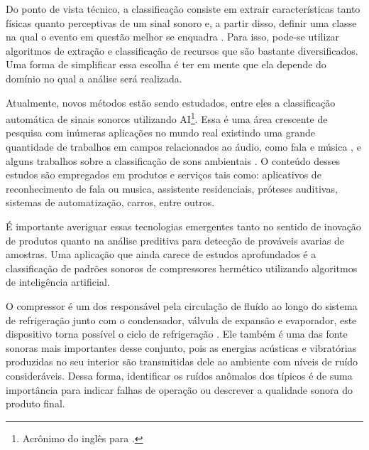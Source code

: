     
    
    Do ponto de vista técnico, a classificação consiste em extrair características tanto físicas quanto perceptivas de um sinal sonoro e, a partir disso, definir uma classe na qual o evento em questão melhor se enquadra \cite{alias2016review}. Para isso, pode-se utilizar algoritmos de extração e classificação de recursos que são bastante diversificados. Uma forma de simplificar essa escolha é ter em mente que ela depende do domínio no qual a análise será realizada. 
    
    Atualmente, novos métodos estão sendo estudados, entre eles a classificação automática de sinais sonoros utilizando \gls{AI}\footnote{Acrônimo do inglês para \ai.}. Essa é uma área crescente de pesquisa com inúmeras aplicações no mundo real existindo uma grande quantidade de trabalhos em campos relacionados ao áudio\cite{unknown}, como fala \cite{abdel2014convolutional} e música \cite{boddapati2017classifying}, e alguns trabalhos sobre a classificação de sons ambientais \cite{boddapati2017classifying}. O conteúdo desses estudos são empregados em produtos e serviços tais como: aplicativos de reconhecimento de fala ou musica, assistente residenciais, próteses auditivas, sistemas de automatização, carros, entre outros. 
    
    É importante averiguar essas tecnologias emergentes tanto no sentido de inovação de produtos quanto na análise preditiva para detecção de prováveis avarias de amostras. Uma aplicação que ainda carece de estudos aprofundados é a classificação de padrões sonoros de compressores hermético utilizando algoritmos de inteligência artificial.
    
    O compressor é um dos responsável pela circulação de fluído ao longo do sistema de refrigeração junto com o condensador, válvula de expansão e evaporador, este dispositivo torna possível o ciclo de refrigeração \cite{boabaid2017estudo}. Ele também é uma das fonte sonoras mais importantes desse conjunto, pois as energias acústicas e vibratórias produzidas no seu interior são transmitidas dele ao ambiente com níveis de ruído consideráveis. Dessa forma, identificar os ruídos anômalos dos típicos é de suma importância para indicar falhas de operação ou descrever a qualidade sonora do produto final.
    
